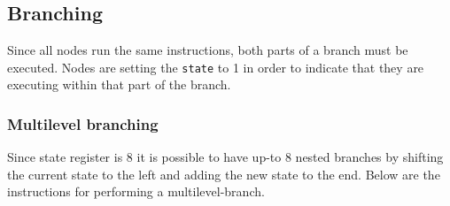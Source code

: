 

\subsection{Branching}

Since all nodes run the same instructions, both parts of a branch must be
executed. Nodes are setting the {\tt state} to 1 in order to indicate that they
are executing within that part of the branch.



\subsubsection{Multilevel branching}
Since state register is 8 it is possible to have up-to 8 nested branches by
shifting the current state to the left and adding the new state to the
end. Below  are the
instructions for performing a multilevel-branch.


